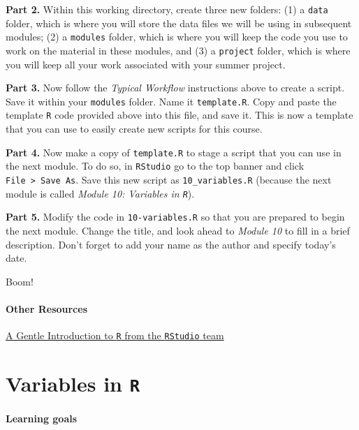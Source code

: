 \documentclass[
]{book}
\begin{document}
\textbf{Part 2.} Within this working directory, create three new folders: (1) a \texttt{data} folder, which is where you will store the data files we will be using in subsequent modules; (2) a \texttt{modules} folder, which is where you will keep the code you use to work on the material in these modules, and (3) a \texttt{project} folder, which is where you will keep all your work associated with your summer project.

\textbf{Part 3.} Now follow the \emph{Typical Workflow} instructions above to create a script. Save it within your \texttt{modules} folder. Name it \texttt{template.R}. Copy and paste the template \texttt{R} code provided above into this file, and save it. This is now a template that you can use to easily create new scripts for this course.

\textbf{Part 4.} Now make a copy of \texttt{template.R} to stage a script that you can use in the next module. To do so, in \texttt{RStudio} go to the top banner and click \texttt{File\ \textgreater{}\ Save\ As}. Save this new script as \texttt{10\_variables.R} (because the next module is called \emph{Module 10: Variables in \texttt{R}}).

\textbf{Part 5.} Modify the code in \texttt{10-variables.R} so that you are prepared to begin the next module. Change the title, and look ahead to \emph{Module 10} to fill in a brief description. Don't forget to add your name as the author and specify today's date.

Boom!

\hypertarget{other-resources-1}{%
\subsubsection*{Other Resources}\label{other-resources-1}}

\href{https://www.rstudio.com/resources/webinars/a-gentle-introduction-to-tidy-statistics-in-r/}{A Gentle Introduction to \texttt{R} from the \texttt{RStudio} team}

\hypertarget{variables-in-r}{%
\chapter{\texorpdfstring{Variables in \texttt{R}}{Variables in R}}\label{variables-in-r}}

\hypertarget{learning-goals-2}{%
\subsubsection*{Learning goals}\label{learning-goals-2}}
\end{document}
